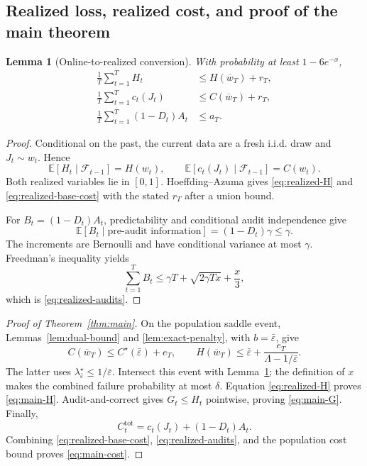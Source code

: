 \documentclass[11pt]{article}
\newtheorem{lemma}{Lemma}
\newcommand{\E}{\mathbb{E}}
\newcommand{\eps}{\varepsilon}
\newcommand{\calF}{\mathcal{F}}
\begin{document}
\subsection{Realized loss, realized cost, and proof of the main theorem}

\begin{lemma}[Online-to-realized conversion]
\label{lem:realized}
With probability at least $1-6e^{-x}$,
\begin{align}
  \frac1T\sum_{t=1}^T H_t
  &\le H(\overline w_T)+r_T,
  \label{eq:realized-H}\\
  \frac1T\sum_{t=1}^T c_t(J_t)
  &\le C(\overline w_T)+r_T,
  \label{eq:realized-base-cost}\\
  \frac1T\sum_{t=1}^T(1-D_t)A_t
  &\le a_T.
  \label{eq:realized-audits}
\end{align}
\end{lemma}

\begin{proof}
Conditional on the past, the current data are a fresh i.i.d. draw and
$J_t\sim w_t$.  Hence
\[
  \E[H_t\mid\calF_{t-1}]=H(w_t),
  \qquad
  \E[c_t(J_t)\mid\calF_{t-1}]=C(w_t).
\]
Both realized variables lie in $[0,1]$.  Hoeffding--Azuma gives
\eqref{eq:realized-H} and \eqref{eq:realized-base-cost} with the stated
$r_T$ after a union bound.

For $B_t=(1-D_t)A_t$, predictability and conditional audit independence give
\[
  \E[B_t\mid\text{pre-audit information}]
  =(1-D_t)\gamma\le\gamma.
\]
The increments are Bernoulli and have conditional variance at most $\gamma$.
Freedman's inequality yields
\[
  \sum_{t=1}^T B_t
  \le
  \gamma T+\sqrt{2\gamma Tx}+\frac{x}{3},
\]
which is \eqref{eq:realized-audits}.
\end{proof}

\begin{proof}[Proof of Theorem~\ref{thm:main}]
On the population saddle event, Lemmas~\ref{lem:dual-bound} and
\ref{lem:exact-penalty}, with $b=\bar\eps$, give
\[
  C(\overline w_T)\le C^\star(\bar\eps)+e_T,
  \qquad
  H(\overline w_T)
  \le\bar\eps+\frac{e_T}{\Lambda-1/\bar\eps}.
\]
The latter uses $\lambda^\star_{\bar\eps}\le1/\bar\eps$.
Intersect this event with Lemma~\ref{lem:realized}; the definition of $x$
makes the combined failure probability at most $\delta$.
Equation \eqref{eq:realized-H} proves \eqref{eq:main-H}.
Audit-and-correct gives $G_t\le H_t$ pointwise, proving
\eqref{eq:main-G}.  Finally,
\[
  C_t^{\mathrm{tot}}
  =c_t(J_t)+(1-D_t)A_t.
\]
Combining \eqref{eq:realized-base-cost},
\eqref{eq:realized-audits}, and the population cost bound proves
\eqref{eq:main-cost}.
\end{proof}
\end{document}
